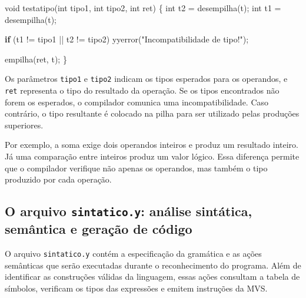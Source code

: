 \documentclass[
  brazilian,
  letterpaper,
]{book}
\newenvironment{Shaded}{\begin{snugshade}}{\end{snugshade}}
\newcommand{\CharTok}[1]{\textcolor[rgb]{0.13,0.47,0.30}{#1}}
\newcommand{\ControlFlowTok}[1]{\textcolor[rgb]{0.00,0.23,0.31}{\textbf{#1}}}
\newcommand{\DataTypeTok}[1]{\textcolor[rgb]{0.68,0.00,0.00}{#1}}
\newcommand{\NormalTok}[1]{\textcolor[rgb]{0.00,0.23,0.31}{#1}}
\newcommand{\OperatorTok}[1]{\textcolor[rgb]{0.37,0.37,0.37}{#1}}
\newcommand{\StringTok}[1]{\textcolor[rgb]{0.13,0.47,0.30}{#1}}
\theoremstyle{plain}
\theoremstyle{definition}
\theoremstyle{remark}
\begin{document}
\begin{Shaded}
\begin{Highlighting}[]
\DataTypeTok{void}\NormalTok{ testatipo}\OperatorTok{(}\DataTypeTok{int}\NormalTok{ tipo1}\OperatorTok{,} \DataTypeTok{int}\NormalTok{ tipo2}\OperatorTok{,} \DataTypeTok{int}\NormalTok{ ret}\OperatorTok{)}
\OperatorTok{\{}
    \DataTypeTok{int}\NormalTok{ t2 }\OperatorTok{=}\NormalTok{ desempilha}\OperatorTok{(}\CharTok{\textquotesingle{}t\textquotesingle{}}\OperatorTok{);}
    \DataTypeTok{int}\NormalTok{ t1 }\OperatorTok{=}\NormalTok{ desempilha}\OperatorTok{(}\CharTok{\textquotesingle{}t\textquotesingle{}}\OperatorTok{);}

    \ControlFlowTok{if} \OperatorTok{(}\NormalTok{t1 }\OperatorTok{!=}\NormalTok{ tipo1 }\OperatorTok{||}\NormalTok{ t2 }\OperatorTok{!=}\NormalTok{ tipo2}\OperatorTok{)}
\NormalTok{        yyerror}\OperatorTok{(}\StringTok{"Incompatibilidade de tipo!"}\OperatorTok{);}

\NormalTok{    empilha}\OperatorTok{(}\NormalTok{ret}\OperatorTok{,} \CharTok{\textquotesingle{}t\textquotesingle{}}\OperatorTok{);}
\OperatorTok{\}}
\end{Highlighting}
\end{Shaded}

Os parâmetros \texttt{tipo1} e \texttt{tipo2} indicam os tipos esperados
para os operandos, e \texttt{ret} representa o tipo do resultado da
operação. Se os tipos encontrados não forem os esperados, o compilador
comunica uma incompatibilidade. Caso contrário, o tipo resultante é
colocado na pilha para ser utilizado pelas produções superiores.

Por exemplo, a soma exige dois operandos inteiros e produz um resultado
inteiro. Já uma comparação entre inteiros produz um valor lógico. Essa
diferença permite que o compilador verifique não apenas os operandos,
mas também o tipo produzido por cada operação.

\subsection{\texorpdfstring{O arquivo \texttt{sintatico.y}: análise
sintática, semântica e geração de
código}{O arquivo sintatico.y: análise sintática, semântica e geração de código}}\label{o-arquivo-sintatico.y-anuxe1lise-sintuxe1tica-semuxe2ntica-e-gerauxe7uxe3o-de-cuxf3digo}

O arquivo \texttt{sintatico.y} contém a especificação da gramática e as
ações semânticas que serão executadas durante o reconhecimento do
programa. Além de identificar as construções válidas da linguagem, essas
ações consultam a tabela de símbolos, verificam os tipos das expressões
e emitem instruções da MVS.
\end{document}
